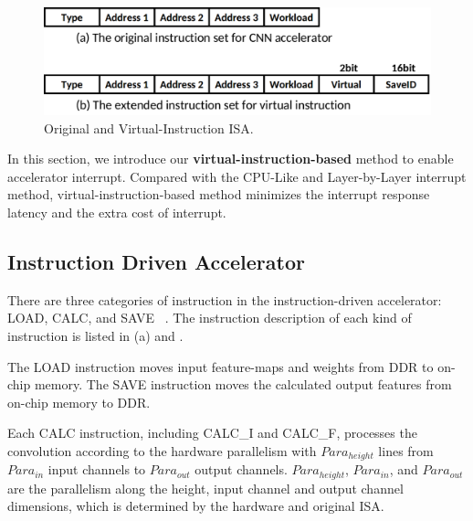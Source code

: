 \begin{figure}[t]
	\centering
    \setlength{\abovecaptionskip}{0cm} 
	\includegraphics[width=0.99\linewidth]{fig/instructions.png}
	\caption{Original and Virtual-Instruction ISA.}
	\label{fig:instructions}
\end{figure}

In this section, we introduce our \textbf{virtual-instruction-based} method to enable accelerator interrupt. Compared with the CPU-Like and Layer-by-Layer interrupt method, virtual-instruction-based method minimizes the interrupt response latency and the extra cost of interrupt.

\subsection{ Instruction Driven Accelerator }

There are three categories of instruction in the instruction-driven accelerator: LOAD, CALC, and SAVE  ~\cite{guo2017angel,qiu2016going,yu2018instruction}. The instruction description of each kind of instruction is listed in (a) and .

The LOAD instruction moves input feature-maps and weights from DDR to on-chip memory. The SAVE instruction moves the calculated output features from on-chip memory to DDR. 

Each CALC  instruction,  including CALC\_I and CALC\_F, processes the convolution according to the hardware parallelism with $Para_{height}$ lines from $ Para_{in} $ input channels to $ Para_{out}$ output channels. $Para_{height}$, $ Para_{in} $, and $ Para_{out} $ are the parallelism along the height, input channel and output channel dimensions, which is determined by the hardware and original ISA.

